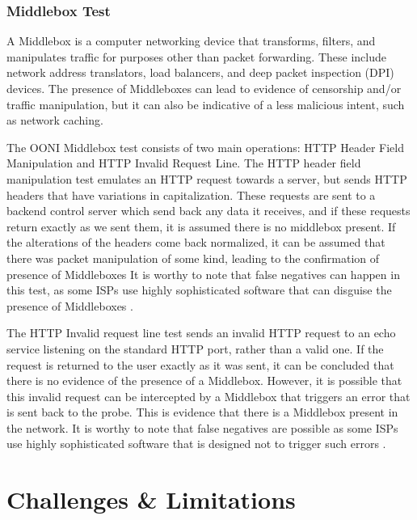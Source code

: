 \subsubsection{Middlebox Test}

A Middlebox is a computer networking device that transforms, filters, and manipulates traffic for purposes other than packet forwarding. These include network address translators, load balancers, and deep packet inspection (DPI) devices. The presence of Middleboxes can lead to evidence of censorship and/or traffic manipulation, but it can also be indicative of a less malicious intent, such as network caching.

The OONI Middlebox test consists of two main operations: HTTP Header Field Manipulation and HTTP Invalid Request Line. The HTTP header field manipulation test emulates an HTTP request towards a server, but sends HTTP headers that have variations in capitalization. These requests are sent to a backend control server which send back any data it receives, and if these requests return exactly as we sent them, it is assumed there is no middlebox present. If the alterations of the headers come back normalized, it can be assumed that there was packet manipulation of some kind, leading to the confirmation of presence of Middleboxes It is worthy to note that false negatives can happen in this test, as some ISPs use highly sophisticated software that can disguise the presence of Middleboxes \cite{ooniHTTPHeader}.  

The HTTP Invalid request line test sends an invalid HTTP request to an echo service listening on the standard HTTP port, rather than a valid one. If the request is returned to the user exactly as it was sent, it can be concluded that there is no evidence of the presence of a Middlebox. However, it is possible that this invalid request can be intercepted by a Middlebox that triggers an error that is sent back to the probe. This is evidence that there is a Middlebox present in the network. It is worthy to note that false negatives are possible as some ISPs use highly sophisticated software that is designed not to trigger such errors \cite{ooniHTTPInvalid}. 

\section{Challenges \& Limitations}


